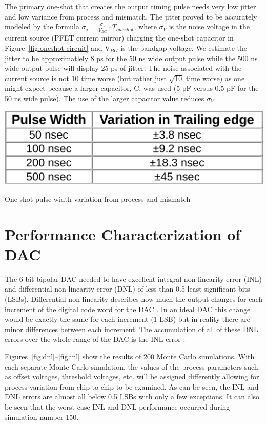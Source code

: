 \documentclass[12pt,oneside,final]{siuethesis}
\theoremstyle{definition}
\begin{document}
\par The primary one-shot that creates the output timing pulse needs very low jitter and low variance from process and mismatch. The jitter proved to be accurately modeled by the formula $\sigma_{j} = \frac{\sigma_{V}}{V_{BG}}\cdot T_{oneshot}$, where $\sigma_{V}$ is the noise voltage in the current source (PFET current mirror) charging the one-shot capacitor in Figure~\ref{fig:oneshot-circuit} and V$_{BG}$ is the bandgap voltage.  We estimate the jitter to be approximatlely 8 ps for the 50 ns wide output pulse while the 500 ns wide output pulse will display 25 ps of jitter.  The noise associated with the current source is not 10 time worse (but rather just $\sqrt{10}$ time worse) as one might expect because a larger capacitor, C, was used (5 pF versus 0.5 pF for the 50 ns wide pulse). The use of the larger capacitor value reduces $\sigma_V$.

\begin{table}[htbp!]
 \centering
 \includegraphics[scale=.25,keepaspectratio=true]{../data/oneshot_mc.png}
 \caption{One-shot pulse width variation from process and mismatch}
 \label{tab:one-shot-mc}
\end{table}

\section{Performance Characterization of DAC}
\par The 6-bit bipolar DAC needed to have excellent integral non-linearity error (INL) and differential non-linearity error (DNL) of less than 0.5 least significant bits (LSBs). Differential non-linearity describes how much the output changes for each increment of the digital code word for the DAC \cite{ALLEN}. In an ideal DAC this change would be exactly the same for each increment (1 LSB) but in reality there are minor differences between each increment. The accumulation of all of these DNL errors over the whole range of the DAC is the INL error \cite{ALLEN}. 

\par Figures~\ref{fig:dnl}--\ref{fig:inl} show the results of 200 Monte Carlo simulations. With each separate Monte Carlo simulation, the values of the process parameters such as offset voltages, threshold voltages, etc. will be assigned differently allowing for process variation from chip to chip to be examined. As can be seen, the INL and DNL errors are almost all below 0.5 LSBs with only a few exceptions. It can also be seen that the worst case INL and DNL performance occurred during simulation number 150.
\end{document}
